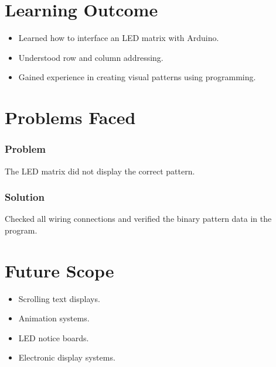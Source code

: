 \documentclass[12pt,a4paper]{report}
\begin{document}
\section{Learning Outcome}

\begin{itemize}

\item Learned how to interface an LED matrix with Arduino.

\item Understood row and column addressing.

\item Gained experience in creating visual patterns using programming.

\end{itemize}

\section{Problems Faced}

\subsubsection{Problem}

The LED matrix did not display the correct pattern.

\vspace{0.3cm}

\subsubsection{Solution}

Checked all wiring connections and verified the binary pattern data in the program.

\section{Future Scope}

\begin{itemize}

\item Scrolling text displays.

\item Animation systems.

\item LED notice boards.

\item Electronic display systems.

\end{itemize}
\end{document}
